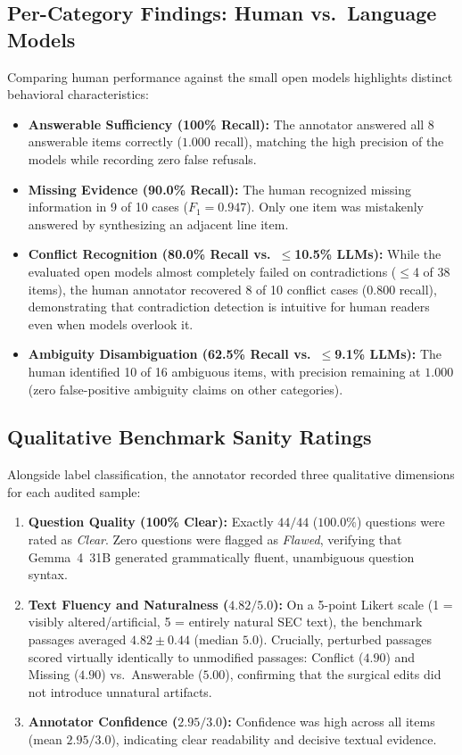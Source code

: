 \documentclass[11pt,letterpaper]{article}
\begin{document}
\subsection{Per-Category Findings: Human vs.\ Language Models}
Comparing human performance against the small open models highlights distinct behavioral characteristics:
\begin{itemize}
    \item \textbf{Answerable Sufficiency (100\% Recall):} The annotator answered all 8 answerable items correctly ($1.000$ recall), matching the high precision of the models while recording zero false refusals.
    \item \textbf{Missing Evidence (90.0\% Recall):} The human recognized missing information in 9 of 10 cases ($F_1 = 0.947$). Only one item was mistakenly answered by synthesizing an adjacent line item.
    \item \textbf{Conflict Recognition (80.0\% Recall vs.\ $\le$10.5\% LLMs):} While the evaluated open models almost completely failed on contradictions ($\le$4 of 38 items), the human annotator recovered 8 of 10 conflict cases ($0.800$ recall), demonstrating that contradiction detection is intuitive for human readers even when models overlook it.
    \item \textbf{Ambiguity Disambiguation (62.5\% Recall vs.\ $\le$9.1\% LLMs):} The human identified 10 of 16 ambiguous items, with precision remaining at $1.000$ (zero false-positive ambiguity claims on other categories).
\end{itemize}

\subsection{Qualitative Benchmark Sanity Ratings}
Alongside label classification, the annotator recorded three qualitative dimensions for each audited sample:
\begin{enumerate}
    \item \textbf{Question Quality (100\% Clear):} Exactly $44/44$ ($100.0\%$) questions were rated as \textit{Clear}. Zero questions were flagged as \textit{Flawed}, verifying that Gemma~4~31B generated grammatically fluent, unambiguous question syntax.
    \item \textbf{Text Fluency and Naturalness ($4.82 / 5.0$):} On a 5-point Likert scale (1 = visibly altered/artificial, 5 = entirely natural SEC text), the benchmark passages averaged $4.82 \pm 0.44$ (median $5.0$). Crucially, perturbed passages scored virtually identically to unmodified passages: Conflict ($4.90$) and Missing ($4.90$) vs.\ Answerable ($5.00$), confirming that the surgical edits did not introduce unnatural artifacts.
    \item \textbf{Annotator Confidence ($2.95 / 3.0$):} Confidence was high across all items (mean $2.95 / 3.0$), indicating clear readability and decisive textual evidence.
\end{enumerate}
\end{document}
